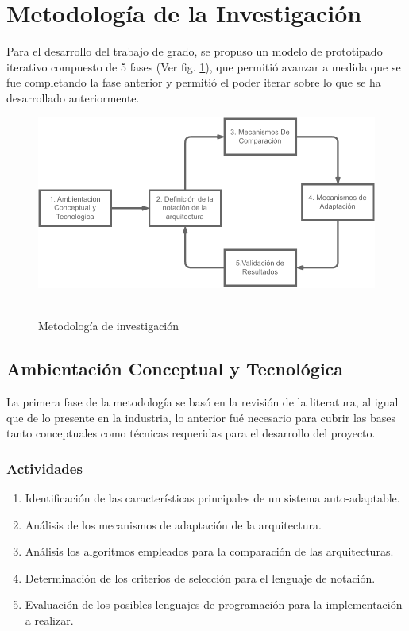 \section{Metodología de la Investigación}

Para el desarrollo del trabajo de grado, se propuso un modelo de prototipado iterativo compuesto de 5 fases (Ver fig. \ref{fig:met}), que permitió avanzar a medida que se fue completando la fase anterior y permitió el poder iterar sobre lo que se ha desarrollado anteriormente.

\begin{figure}[H]
    \centering
    \caption{\\Metodología de investigación}
    \includegraphics[width=0.7\linewidth]{images/Metodologia.pdf}
    \label{fig:met}
\end{figure}

\subsection{Ambientación Conceptual y Tecnológica}

La primera fase de la metodología se basó en la revisión de la literatura, al igual que de lo presente en la industria, lo anterior fué necesario para cubrir las bases tanto conceptuales como técnicas requeridas para el desarrollo del proyecto. 

\subsubsection*{Actividades}

\begin{enumerate}
    \itemsep-2mm
    \item Identificación de las características principales de un sistema auto-adaptable.
    \item Análisis de los mecanismos de adaptación de la arquitectura.
    \item Análisis los algoritmos empleados para la comparación de las arquitecturas.
    \item Determinación de los criterios de selección para el lenguaje de notación.
    \item Evaluación de los posibles lenguajes de programación para la implementación a realizar.
\end{enumerate} 

